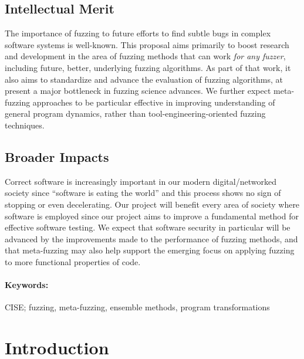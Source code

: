 \documentclass[numbers]{proposalnsf}
\begin{document}
\subsection*{Intellectual Merit} 
\vspace{-2mm}
The importance of fuzzing to future efforts to find subtle bugs in complex software systems is well-known.  This proposal aims primarily to boost research and development in the area of fuzzing methods that can work \emph{for any fuzzer}, including future, better, underlying fuzzing algorithms.  As part of that work, it also aims to standardize and advance the evaluation of fuzzing algorithms, at present a major bottleneck in fuzzing science advances.  We further expect meta-fuzzing approaches to be particular effective in improving understanding of general program dynamics, rather than tool-engineering-oriented fuzzing techniques.
\subsection*{Broader Impacts}
\vspace{-2mm}

Correct software is increasingly important in our modern digital/networked society since ``software is eating the world'' and this process shows no sign of stopping or even decelerating. 
Our project will benefit every area of society where software is employed since our project aims to improve a fundamental method for effective software testing.
We expect that software security in particular will be advanced by the improvements made to the performance of fuzzing methods, and that meta-fuzzing may also help support the emerging focus on applying fuzzing to more functional properties of code.

\paragraph{Keywords:}
CISE; fuzzing, meta-fuzzing, ensemble methods, program transformations



\newpage  

\section{Introduction}
\label{sec:intro}
\end{document}
